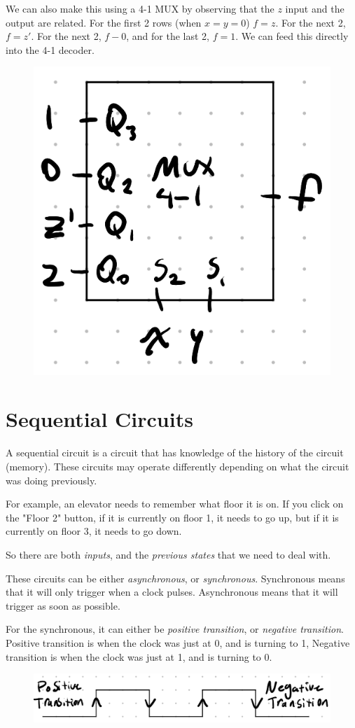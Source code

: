 \documentclass[12pt,letterpaper]{article} \usepackage{amsmath} \usepackage{graphicx}  \usepackage{longtable}  \usepackage{amssymb}
\begin{document}
\begin{mdframed}
            We can also make this using a 4-1 MUX by observing that the $z$ input and the output are related. For the first 2 rows (when $x=y=0$) $f=z$. For the next 2, $f=z'$. For the next 2, $f-0$, and for the last 2, $f=1$. We can feed this directly into the 4-1 decoder.
            \begin{figure}[H]
                \centering
                \includegraphics[width=0.2\linewidth]{ex6-3.png}
            \end{figure}
        \end{mdframed}

    \section{Sequential Circuits}
    A sequential circuit is a circuit that has knowledge of the history of the circuit (memory). These circuits may operate differently depending on what the circuit was doing previously. 

    For example, an elevator needs to remember what floor it is on. If you click on the "Floor 2" button, if it is currently on floor 1, it needs to go up, but if it is currently on floor 3, it needs to go down. 

    So there are both \emph{inputs}, and the \emph{previous states} that we need to deal with. 

    These circuits can be either \emph{asynchronous}, or \emph{synchronous}. Synchronous means that it will only trigger when a clock pulses. Asynchronous means that it will trigger as soon as possible. 

    For the synchronous, it can either be \emph{positive transition}, or \emph{negative transition}. Positive transition is when the clock was just at 0, and is turning to 1, Negative transition is when the clock was just at 1, and is turning to 0. 

    \begin{figure}[H]
        \centering
        \includegraphics[width=0.7\linewidth]{pos-neg-trans.png}
    \end{figure}
\end{document}
